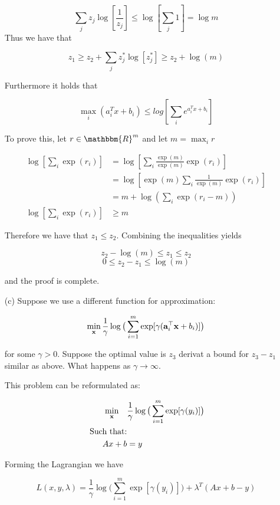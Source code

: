 \documentclass{article} %
\newcommand{\R}{\mathbbm{R}}
\renewcommand\a{{\bf a}}
\newcommand\x{{\bf x}}
\renewcommand\a{{\bf a}}
\begin{document}
\begin{itemize}
\[
\sum_{j} z_j \log[\frac{1}{z_j}] \leq \log[\sum_{j} 1] = \log{m}
\]
Thus we have that 

\[
z_1 \geq z_2 + \sum_{j}z_j^{*} \log[z_j^*] \geq z_2 + \log(m)
\]

Furthermore it holds that 

\[
\max_{i}(a_i^T x + b_i) \leq log[\sum_{i} e^{a_i^T x + b_i}]
\]

To prove this, let $r \in \R^m$ and let $m = \max_i r$

\begin{equation*}
\begin{aligned}
\log[\sum_{i} \exp(r_i)] &= \log[\sum_i \frac{\exp(m)}{\exp(m)} \exp(r_i)] \\ 
&= \log[ \exp(m) \sum_{i} \frac{1}{\exp(m)} \exp(r_i) ] \\ 
&= m + \log(\sum_i \exp(r_i - m) ) \\ 
\log[\sum_{i} \exp(r_i)]  &\geq m
\end{aligned}
\end{equation*}

Therefore we have that $z_1 \leq z_2$. Combining the inequalities yields

\[
z_2 - \log(m) \leq z_1 \leq z_2
\]
\[
0 \leq z_2 - z_1 \leq \log(m)
\]

and the proof is complete. 
\item[(c)]  Suppose we use a different function for approximation:

\[
\min_{\x} \frac{1}{\gamma} \log \big(  \sum_{i=1}^{m} \exp[\gamma(\a_i^{\top} \x +  b_i)] \big)
\]

for some $\gamma > 0$. Suppose the optimal value is $z_3$ derivat a bound for $z_3 - z_1$ similar as above. What happens as $\gamma \to \infty$. 



This problem can be reformulated as:

\begin{equation*}
\begin{aligned}
\min_{\x} \quad &\frac{1}{\gamma} \log \big(  \sum_{i=1}^{m} \exp[\gamma(y_i)] \big) \\ 
\mbox{ Such that:} & \\ 
Ax + b &= y
\end{aligned}
\end{equation*}

Forming the Lagrangian we have

\[
L(x,y,\lambda) = \frac{1}{\gamma} \log \big(  \sum_{i=1}^{m} \exp[\gamma(y_i)] \big) + \lambda^T(Ax + b - y)
\]


\end{itemize}
\end{document}
